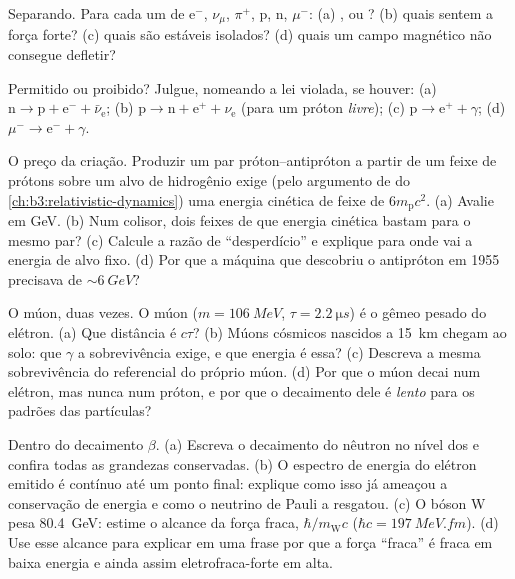 \begin{exercise}[$\star$]\label{exo:b3:particle-physics:2}
Separando. Para cada um de e$^-$, $\nu_\mu$, $\pi^+$, p, n,
$\mu^-$: (a) ,  ou ? (b) quais sentem a força
forte? (c) quais são estáveis isolados? (d) quais um
campo magnético não consegue defletir?
\end{exercise}

\begin{exercise}[$\star$]\label{exo:b3:particle-physics:3}
Permitido ou proibido? Julgue, nomeando a lei violada, se houver:
(a) $\text{n} \to \text{p} + \text{e}^- + \bar\nu_{\text{e}}$;
(b) $\text{p} \to \text{n} + \text{e}^+ + \nu_{\text{e}}$ (para
um próton \emph{livre});
(c) $\text{p} \to \text{e}^+ + \gamma$;
(d) $\mu^- \to \text{e}^- + \gamma$.
\end{exercise}

\begin{exercise}[$\star$]\label{exo:b3:particle-physics:4}
O preço da criação. Produzir um par próton--antipróton a partir
de um feixe de prótons sobre um alvo de hidrogênio exige (pelo
argumento de  do \cref{ch:b3:relativistic-dynamics}) uma
energia cinética de feixe de $6m_{\text{p}}c^2$. (a) Avalie em GeV.
(b) Num colisor, dois feixes de que energia cinética bastam para
o mesmo par? (c) Calcule a razão de ``desperdício'' e explique para onde
vai a energia de alvo fixo. (d) Por que a máquina que descobriu o
antipróton em 1955 precisava de $\sim\qty{6}{GeV}$?
\end{exercise}

\begin{exercise}[$\star\star$]\label{exo:b3:particle-physics:5}
O múon, duas vezes. O múon ($m = \qty{106}{MeV}$,
$\tau = \qty{2.2}{\micro s}$) é o gêmeo pesado do elétron. (a)
Que distância é $c\tau$? (b) Múons cósmicos nascidos a
\qty{15}{km} chegam ao solo: que $\gamma$ a sobrevivência
exige, e que energia é essa? (c) Descreva a mesma sobrevivência
do referencial do próprio múon. (d) Por que o múon decai num
elétron, mas nunca num próton, e por que o decaimento dele é
\emph{lento} para os padrões das partículas?
\end{exercise}

\begin{exercise}[$\star\star$]\label{exo:b3:particle-physics:6}
Dentro do decaimento $\beta$. (a) Escreva o decaimento do nêutron no
nível dos  e confira todas as grandezas conservadas. (b) O espectro
de energia do elétron emitido é contínuo até um ponto final:
explique como isso já ameaçou a conservação de energia e como
o neutrino de Pauli a resgatou. (c) O bóson W pesa
\qty{80.4}{GeV}: estime o alcance da força fraca,
$\hbar/m_{\text{W}}c$ ($\hbar c = \qty{197}{MeV.fm}$). (d) Use
esse alcance para explicar em uma frase por que a força ``fraca'' é
fraca em baixa energia e ainda assim eletrofraca-forte em alta.
\end{exercise}

